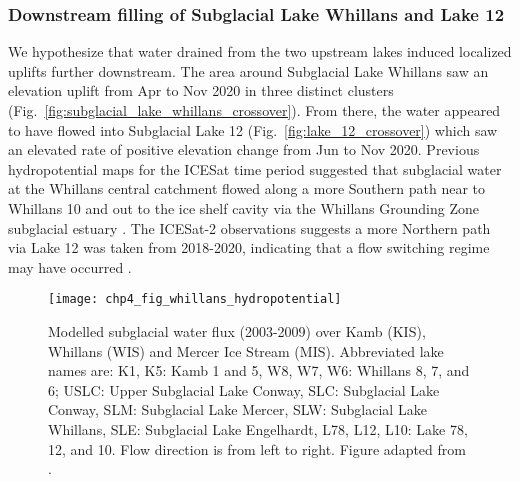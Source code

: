 \subsubsection{Downstream filling of Subglacial Lake Whillans and Lake 12}

We hypothesize that water drained from the two upstream lakes induced localized uplifts further downstream.
The area around Subglacial Lake Whillans \citep{TulaczykWISSARDSubglacialLake2014} saw an elevation uplift from Apr to Nov 2020 in three distinct clusters (Fig.~\ref{fig:subglacial_lake_whillans_crossover}).
From there, the water appeared to have flowed into Subglacial Lake 12 (Fig.~\ref{fig:lake_12_crossover}) which saw an elevated rate of positive elevation change from Jun to Nov 2020.
Previous hydropotential maps for the ICESat time period \citep[2003-2009, see Fig.~\ref{fig:whillans_hydropotential}][]{CarterEvidencerapidsubglacial2013} suggested that subglacial water at the Whillans central catchment flowed along a more Southern path near to Whillans 10 \citep{SiegfriedEpisodicicevelocity2016} and out to the ice shelf cavity via the Whillans Grounding Zone subglacial estuary \citep[see][]{HorganSubglacialLakeWhillans2012,VenturelliMidHoloceneGrounding2020}.
The ICESat-2 observations suggests a more Northern path via Lake 12 was taken from 2018-2020, indicating that a flow switching regime may have occurred \citep[c.f.][]{CarterEvidencerapidsubglacial2013}.

\begin{figure}[htbp]
  \texttt{[image: chp4\_fig\_whillans\_hydropotential]}
  \caption[Modelled subglacial water flux (2003-2009) over Kamb, Whillans and Mercer Ice Stream]{
    Modelled subglacial water flux (2003-2009) over Kamb (KIS), Whillans (WIS) and Mercer Ice Stream (MIS).
    Abbreviated lake names are: K1, K5: Kamb 1 and 5, W8, W7, W6: Whillans 8, 7, and 6; USLC: Upper Subglacial Lake Conway, SLC: Subglacial Lake Conway, SLM: Subglacial Lake Mercer, SLW: Subglacial Lake Whillans, SLE: Subglacial Lake Engelhardt, L78, L12, L10: Lake 78, 12, and 10.
    Flow direction is from left to right.
    Figure adapted from \citet{CarterEvidencerapidsubglacial2013}.
  }
  \label{fig:whillans_hydropotential}
\end{figure}

